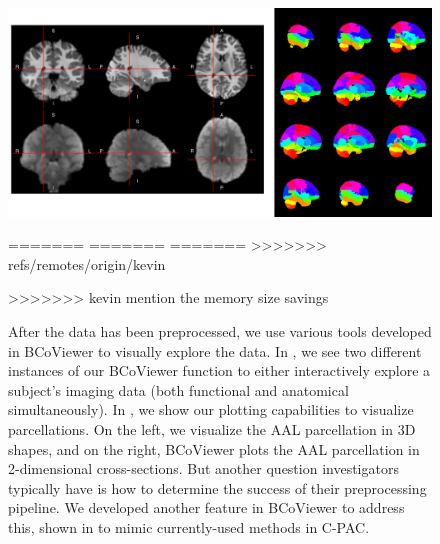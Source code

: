 \documentclass{nature}
\begin{document}
{\begin{figure}[tb]
\centering
\includegraphics[width=400pt]{fig/brainconductor/BCoViewer.png}
\caption{(Left) An interactive imaging viewer in BCoViewer designed in R to mimic fslview. (Right) A parcellation plotter in BCoViewer. Each color represents a different parcel.}
\label{fig:features}
=======
=======
=======
>>>>>>> refs/remotes/origin/kevin

>>>>>>> kevin
{\color{red}mention the memory size savings}

After the data has been preprocessed, we use various tools developed in
BCoViewer
to visually explore the data. In , we see two different
instances
of our BCoViewer function to either interactively explore a subject's imaging
data (both
functional and anatomical simultaneously). 
In , we show our plotting capabilities to visualize parcellations.
On the left, we visualize the AAL parcellation in 3D shapes, and on the right, BCoViewer plots the AAL
parcellation in 2-dimensional cross-sections. But another question investigators typically
have is 
how to determine the success of their preprocessing pipeline. We developed
another feature
in BCoViewer to address this, shown in  to mimic
currently-used methods
in C-PAC.


\begin{figure}
\centering
\begin{subfigure}{.5\textwidth}
  \centering
 

\end{subfigure}
\end{figure}
\end{figure}}
\end{document}
